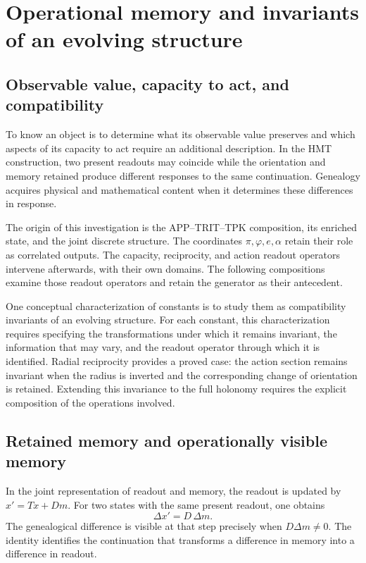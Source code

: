 \section{Operational memory and invariants of an evolving structure}
\label{md:lectin:seccion}

\subsection{Observable value, capacity to act, and compatibility}
\label{md:lectin:valor}

To know an object is to determine what its observable value preserves and which
aspects of its capacity to act require an additional description.
In the HMT construction, two present readouts may coincide while
the orientation and memory retained produce different responses
to the same continuation. Genealogy acquires
physical and mathematical content when it determines these differences in response.

The origin of this investigation is the APP--TRIT--TPK composition, its
enriched state, and the joint discrete structure. The coordinates
$\pi,\varphi,e,\alpha$ retain their role as correlated outputs.
The capacity, reciprocity, and action readout operators intervene afterwards,
with their own domains. The following compositions examine those
readout operators and retain the generator as their antecedent.

One conceptual characterization of constants is to study them
as compatibility invariants of an evolving structure.
For each constant, this characterization requires specifying the
transformations under which it remains invariant, the information
that may vary, and the readout operator through which it is identified. Radial
reciprocity provides a proved case: the action section
remains invariant when the radius is inverted and the
corresponding change of orientation is retained. Extending this
invariance to the full holonomy requires the explicit composition
of the operations involved.

\subsection{Retained memory and operationally visible memory}
\label{md:lectin:memoria-visible}

In the joint representation of readout and memory, the readout is updated
by $x'=Tx+Dm$. For two states with the same
present readout, one obtains
\begin{equation}
 \Delta x'=D\,\Delta m.
 \label{md:lectin:diferencia-memoria}
\end{equation}
The genealogical difference is visible at that step precisely when
$D\Delta m\ne0$. The identity identifies the continuation that
transforms a difference in memory into a difference in readout.

